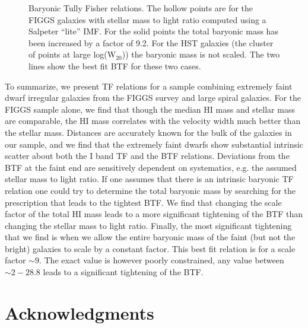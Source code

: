 \documentclass[useAMS,usenatbib]{mn2e}
\begin{document}
\begin{figure}
\caption{Baryonic Tully Fisher relations. The hollow points are for the FIGGS galaxies with stellar mass to light ratio computed using a Salpeter ``lite'' IMF. For the solid points the total baryonic mass has been increased by a factor of 9.2. For the HST galaxies (the cluster of points at large log(W$_{20}$)) the baryonic mass is not scaled. The two lines show the best fit BTF for these two cases.}
\label{fig:vmbar_btf}
\end{figure}


To summarize, we present TF relations for a sample combining extremely faint dwarf irregular galaxies from the FIGGS survey and large spiral galaxies. For the FIGGS sample alone, we find that though the median HI mass and stellar mass are comparable, the HI mass correlates with the velocity width much better than the stellar mass. Distances are accurately known for the bulk of the galaxies in our sample, and we find that the extremely faint dwarfs show substantial intrinsic scatter about both the I band TF and the BTF relations. Deviations from the BTF at the faint end are sensitively dependent on systematics, e.g. the assumed stellar mass to light ratio. If one assumes that there is an intrinsic baryonic TF relation one could try to determine the total baryonic mass by searching for the prescription that leads to the tightest BTF. We find that changing the scale factor of the total HI mass leads to a more significant tightening of the BTF than changing the stellar mass to light ratio. Finally, the most significant tightening that we find is when we allow the entire baryonic mass of the faint (but not the bright) galaxies to scale by
a constant factor. This best fit relation is for a scale factor $\sim 9$. The exact value is however poorly constrained, any value between $\sim 2 - 28.8$ leads to a significant tightening of the BTF.

\section*{Acknowledgments}
\end{document}
